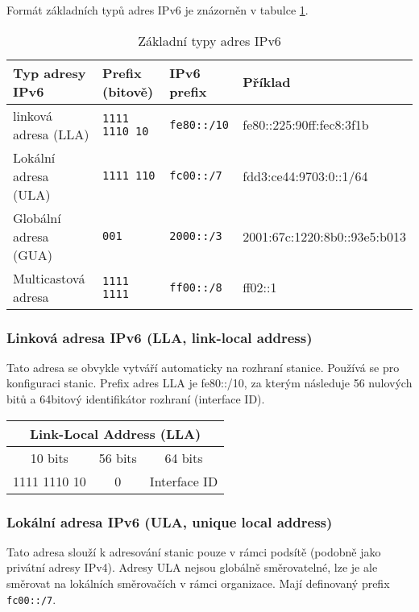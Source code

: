 Formát základních typů adres IPv6 je znázorněn v tabulce \ref{obr:IPv6_types}.
\begin{table}[h]
    \begin{center}
      \begin{tabular}{|l|l|l|l|}
        \hline
        Typ adresy IPv6 & Prefix (bitově) & IPv6 prefix & Příklad\\
        \hline\hline
        linková adresa (LLA)  & {\tt 1111 1110 10} & {\tt fe80::/10} & fe80::225:90ff:fec8:3f1b\\
        \hline
        Lokální adresa (ULA)   & {\tt 1111 110} & {\tt fc00::/7} & fdd3:ce44:9703:0::1/64 \\
        \hline
        Globální adresa (GUA)  & {\tt 001} & {\tt 2000::/3} & 2001:67c:1220:8b0::93e5:b013\\
        \hline
        Multicastová adresa & {\tt 1111 1111} & {\tt ff00::/8}&  ff02::1\\
        \hline
      \end{tabular}
    \end{center}
    \caption{Základní typy adres IPv6}\label{obr:IPv6_types}
\end{table}

\subsubsection{Linková adresa IPv6 (LLA, link-local address)}
Tato adresa se obvykle vytváří automaticky na rozhraní stanice. Používá se pro konfiguraci stanic. Prefix adres LLA je fe80::/10, za kterým následuje 56 nulových bitů a 64bitový identifikátor rozhraní (interface ID).
\begin{table}[h]
  \begin{center}
    \begin{tabular}{|c|c|c|}
        \multicolumn{3}{c}{Link-Local Address (LLA)}\\
        \hline
        10 bits &  56 bits  & 64 bits \\
        \hline
        1111 1110 10 & 0 & Interface ID \\
        \hline
    \end{tabular}
  \end{center}
\end{table}

\subsubsection{Lokální adresa IPv6 (ULA, unique local address)}\label{ula}
  Tato adresa slouží k adresování stanic pouze v rámci podsítě (podobně jako privátní adresy IPv4). Adresy ULA nejsou globálně směrovatelné, lze je ale směrovat na lokálních směrovačích v rámci organizace. Mají definovaný prefix {\tt fc00::/7}.

